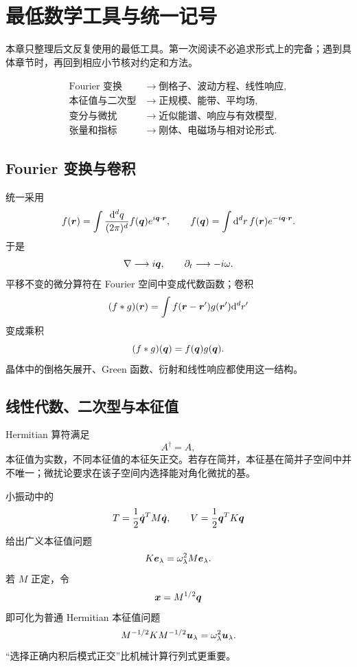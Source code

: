 \chapter{最低数学工具与统一记号}
\label{chap:math-tools}

\begin{prereqbox}
本章只整理后文反复使用的最低工具。第一次阅读不必追求形式上的完备；遇到具体章节时，再回到相应小节核对约定和方法。
\end{prereqbox}

\begin{mapbox}
\[
\begin{aligned}
\text{Fourier 变换}&\longrightarrow
\text{倒格子、波动方程、线性响应},\\
\text{本征值与二次型}&\longrightarrow
\text{正规模、能带、平均场},\\
\text{变分与微扰}&\longrightarrow
\text{近似能谱、响应与有效模型},\\
\text{张量和指标}&\longrightarrow
\text{刚体、电磁场与相对论形式}.
\end{aligned}
\]
\end{mapbox}

\section{Fourier 变换与卷积}
统一采用
\[
f(\bm{r})=\int\frac{\mathrm d^d q}{(2\pi)^d}
f(\bm{q})e^{i\bm{q}\cdot\bm{r}},
\qquad
f(\bm{q})=\int\mathrm d^dr\,f(\bm{r})e^{-i\bm{q}\cdot\bm{r}}.
\]
于是
\[
\nabla\longrightarrow i\bm{q},\qquad
\partial_t\longrightarrow-i\omega.
\]
平移不变的微分算符在 Fourier 空间中变成代数函数；卷积
\[
(f*g)(\bm{r})=\int f(\bm{r}-\bm{r}')g(\bm{r}')\mathrm d^dr'
\]
变成乘积
\[
(f*g)(\bm{q})=f(\bm{q})g(\bm{q}).
\]
晶体中的倒格矢展开、Green 函数、衍射和线性响应都使用这一结构。

\section{线性代数、二次型与本征值}
Hermitian 算符满足
\[
A^\dagger=A,
\]
本征值为实数，不同本征值的本征矢正交。若存在简并，本征基在简并子空间中并不唯一；微扰论要求在该子空间内选择能对角化微扰的基。

小振动中的
\[
T=\frac12\dot{\bm{q}}^{T}M\dot{\bm{q}},
\qquad
V=\frac12\bm{q}^{T}K\bm{q}
\]
给出广义本征值问题
\[
K\bm{e}_\lambda=\omega_\lambda^2M\bm{e}_\lambda.
\]
若 $M$ 正定，令
\[
\bm{x}=M^{1/2}\bm{q}
\]
即可化为普通 Hermitian 本征值问题
\[
M^{-1/2}KM^{-1/2}\bm{u}_\lambda
=\omega_\lambda^2\bm{u}_\lambda.
\]
“选择正确内积后模式正交”比机械计算行列式更重要。

